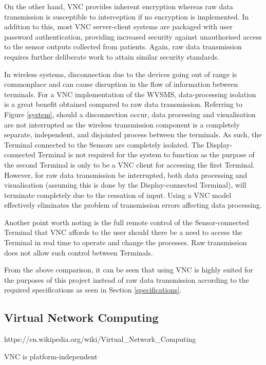 On the other hand, VNC provides inherent encryption whereas raw data transmission is susceptible to interception if no encryption is implemented. In addition to this, most VNC server-client systems are packaged with user password authentication, providing increased security against unauthorised access to the sensor outputs collected from patients. Again, raw data transmission requires further deliberate work to attain similar security standards. 

In wireless systems, disconnection due to the devices going out of range is commonplace and can cause disruption in the flow of information between terminals. For a VNC implementation of the WVSMS, data-processing isolation is a great benefit obtained compared to raw data transmission. Referring to Figure \ref{system}, should a disconnection occur, data processing and visualisation are not interrupted as the wireless transmission component is a completely separate, independent, and disjointed process between the terminals. As such, the Terminal connected to the Sensors are completely isolated. The Display-connected Terminal is not required for the system to function as the purpose of the second Terminal is only to be a VNC client for accessing the first Terminal. However, for raw data transmission be interrupted, both data processing and visualisation (assuming this is done by the Display-connected Terminal), will terminate completely due to the cessation of input. Using a VNC model effectively eliminates the problem of transmission errors affecting data processing.  

Another point worth noting is the full remote control of the Sensor-connected Terminal that VNC affords to the user should there be a need to access the Terminal in real time to operate and change the processes. Raw transmission does not allow such control between Terminals. 

From the above comparison, it can be seen that using VNC is highly suited for the purposes of this project instead of raw data transmission according to the required specifications as seen in Section \ref{specifications}. \\

\subsection{Virtual Network Computing}


https://en.wikipedia.org/wiki/Virtual\_Network\_Computing 

VNC is platform-independent 

